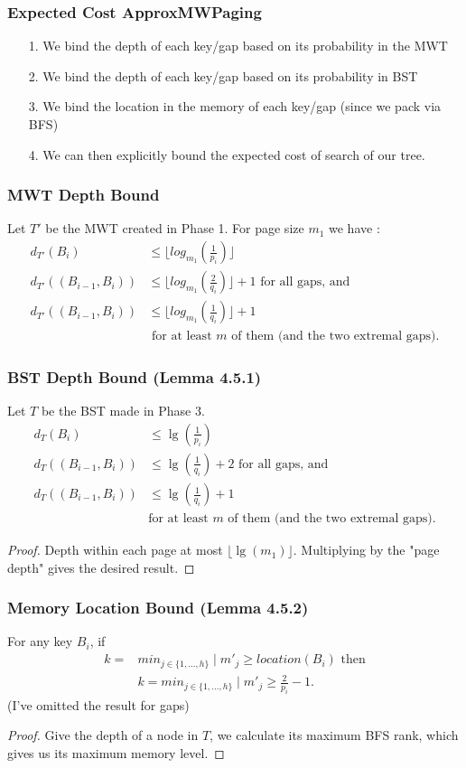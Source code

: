 \documentclass[]{beamer}
\theoremstyle{plain}
\begin{document}
\begin{frame} \frametitle{Expected Cost ApproxMWPaging} \label{45}
\begin{itemize}
\item[1.] We bind the depth of each key/gap based on its probability in the MWT 
\item[2.] We bind the depth of each key/gap based on its probability in BST
\item[3.] We bind the location in the memory of each key/gap (since we pack via BFS)
\item[4.] We can then explicitly bound the expected cost of search of our tree.
\end{itemize}
\end{frame}

\begin{frame}\frametitle{MWT Depth Bound}
Let $T'$ be the MWT created in Phase 1. For page size $m_1$ we have \cite{bose2009efficient}:
\begin{align*} d_{T'}(B_i) &\leq \lfloor log_{m_1}(\frac{1}{p_i}) \rfloor \\
d_{T'}((B_{i-1},B_i)) &\leq \lfloor log_{m_1}(\frac{2}{q_i}) \rfloor + 1 \text{ for all gaps, and}\\
d_{T'}((B_{i-1},B_i)) &\leq \lfloor log_{m_1}(\frac{1}{q_i}) \rfloor + 1 \\ 
&\text{ for at least $m$ of them (and the two extremal gaps).}
 \end{align*}
\end{frame}

\begin{frame}\frametitle{BST Depth Bound (Lemma 4.5.1)}
Let $T$ be the BST made in Phase 3.
\begin{align*} 
d_T(B_i) &\leq \lg(\frac{1}{p_i}) \\
d_T((B_{i-1},B_i)) &\leq \lg(\frac{1}{q_i}) + 2 \text{ for all gaps, and} \\
d_T((B_{i-1},B_i)) &\leq \lg(\frac{1}{q_i}) + 1 \\
&\text{for at least  $m$ of them (and the two extremal gaps).}
\end{align*}
\begin{proof}
Depth within each page at most $\lfloor \lg(m_1) \rfloor$. Multiplying by the "page depth" gives the desired result.
\end{proof}

\end{frame}

\begin{frame}\frametitle{Memory Location Bound (Lemma 4.5.2)}
For any key $B_i$, if
\begin{align*}
k=&min_{j \in \{1, ..., h\}} \mid m'_j \geq location(B_i) \text{ then} \\
&k=min_{j \in \{1, ..., h\}} \mid m'_j \geq \frac{2}{p_i}-1.
\end{align*}
(I've omitted the result for gaps)
\begin{proof}
Give the depth of a node in $T$, we calculate its maximum BFS rank, which gives us its maximum memory level.
\end{proof}
\end{frame}
\end{document}
